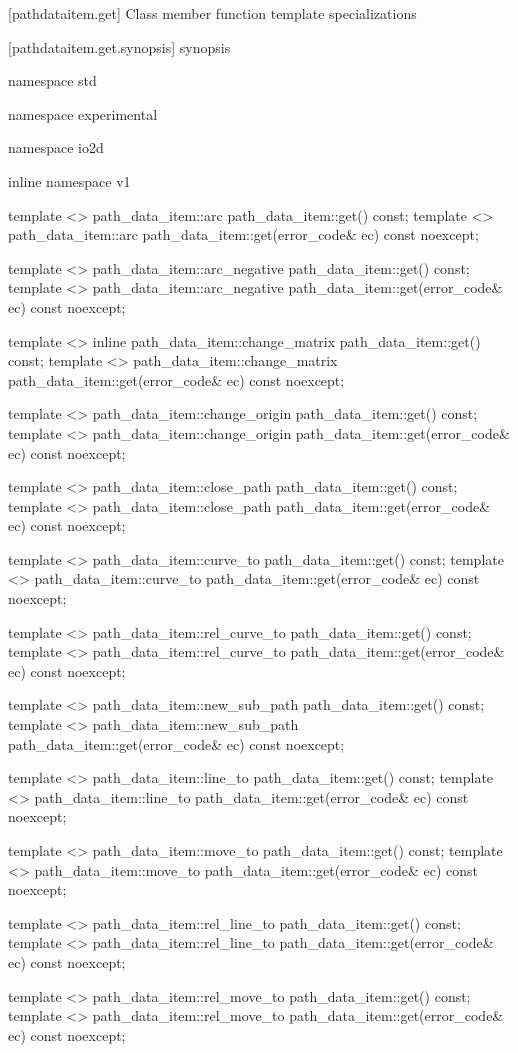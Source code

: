  [pathdataitem.get] {Class  member function template specializations}

 [pathdataitem.get.synopsis] { synopsis}

\begin{codeblock}
namespace std { namespace experimental { namespace io2d { inline namespace v1 {
  template <>
  path_data_item::arc path_data_item::get() const;
  template <>
  path_data_item::arc path_data_item::get(error_code& ec) const noexcept;
  
  template <>
  path_data_item::arc_negative path_data_item::get() const;
  template <>
  path_data_item::arc_negative path_data_item::get(error_code& ec) const 
    noexcept;
  
  template <>
  inline path_data_item::change_matrix path_data_item::get() const;
  template <>
  path_data_item::change_matrix path_data_item::get(error_code& ec) const 
    noexcept;
  
  template <>
  path_data_item::change_origin path_data_item::get() const;
  template <>
  path_data_item::change_origin path_data_item::get(error_code& ec) const 
    noexcept;
  
  template <>
  path_data_item::close_path path_data_item::get() const;
  template <>
  path_data_item::close_path path_data_item::get(error_code& ec) const noexcept;
  
  template <>
  path_data_item::curve_to path_data_item::get() const;
  template <>
  path_data_item::curve_to path_data_item::get(error_code& ec) const noexcept;

  template <>
  path_data_item::rel_curve_to path_data_item::get() const;
  template <>
  path_data_item::rel_curve_to path_data_item::get(error_code& ec) const 
    noexcept;
  
  template <>
  path_data_item::new_sub_path path_data_item::get() const;
  template <>
  path_data_item::new_sub_path path_data_item::get(error_code& ec) const 
    noexcept;

  template <>
  path_data_item::line_to path_data_item::get() const;
  template <>
  path_data_item::line_to path_data_item::get(error_code& ec) const noexcept;

  template <>
  path_data_item::move_to path_data_item::get() const;
  template <>
  path_data_item::move_to path_data_item::get(error_code& ec) const noexcept;

  template <>
  path_data_item::rel_line_to path_data_item::get() const;
  template <>
  path_data_item::rel_line_to path_data_item::get(error_code& ec) const 
    noexcept;

  template <>
  path_data_item::rel_move_to path_data_item::get() const;
  template <>
  path_data_item::rel_move_to path_data_item::get(error_code& ec) const 
    noexcept;
} } } }
\end{codeblock}

